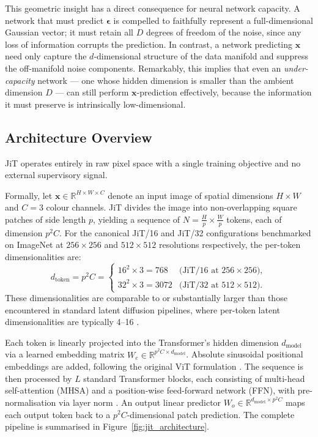 This geometric insight has a direct consequence for neural network capacity. A network that must predict $\bm{\epsilon}$ is compelled to faithfully represent a full-dimensional Gaussian vector; it must retain all $D$ degrees of freedom of the noise, since any loss of information corrupts the prediction. In contrast, a network predicting $\bm{x}$ need only capture the $d$-dimensional structure of the data manifold and suppress the off-manifold noise components. Remarkably, this implies that even an \emph{under-capacity} network — one whose hidden dimension is smaller than the ambient dimension $D$ — can still perform $\bm{x}$-prediction effectively, because the information it must preserve is intrinsically low-dimensional.


\subsection{Architecture Overview}
\label{subsec:jit_architecture}

JiT operates entirely in raw pixel space with a single training objective and no external supervisory signal.

Formally, let $\bm{x} \in \mathbb{R}^{H \times W \times C}$ denote an input image of spatial dimensions $H \times W$ and $C = 3$ colour channels. JiT divides the image into non-overlapping square patches of side length $p$, yielding a sequence of $N = \frac{H}{p} \times \frac{W}{p}$ tokens, each of dimension $p^2 C$. For the canonical JiT/16 and JiT/32 configurations benchmarked on ImageNet at $256 \times 256$ and $512 \times 512$ resolutions respectively, the per-token dimensionalities are:
\begin{equation}
    d_{\text{token}} = p^2 C = \begin{cases} 16^2 \times 3 = 768 & \text{(JiT/16 at } 256 \times 256\text{)}, \\ 32^2 \times 3 = 3072 & \text{(JiT/32 at } 512 \times 512\text{)}. \end{cases}
    \label{eq:jit_token_dim}
\end{equation}
These dimensionalities are comparable to or substantially larger than those encountered in standard latent diffusion pipelines, where per-token latent dimensionalities are typically 4–16 \cite{esser2024sd3}.

Each token is linearly projected into the Transformer's hidden dimension $d_{\text{model}}$ via a learned embedding matrix $W_e \in \mathbb{R}^{p^2 C \times d_{\text{model}}}$. Absolute sinusoidal positional embeddings are added, following the original ViT formulation \cite{dosovitskiy2020image}. The sequence is then processed by $L$ standard Transformer blocks, each consisting of multi-head self-attention (MHSA) and a position-wise feed-forward network (FFN), with pre-normalisation via layer norm \cite{ba2016layer}. An output linear predictor $W_o \in \mathbb{R}^{d_{\text{model}} \times p^2 C}$ maps each output token back to a $p^2 C$-dimensional patch prediction. The complete pipeline is summarised in Figure~\ref{fig:jit_architecture}.

